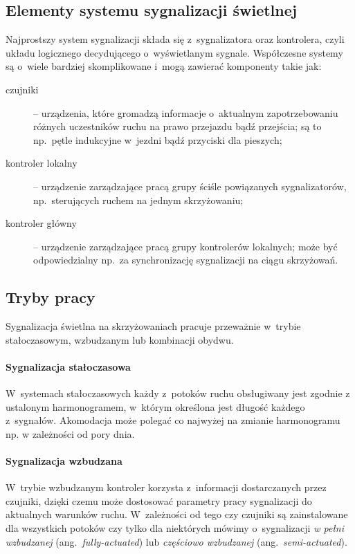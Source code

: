 \documentclass{pracamgr}
\newcommand{\ang}[1]{(ang.~\emph{#1})}
\theoremstyle{plain}
\begin{document}
\subsection{Elementy systemu sygnalizacji świetlnej}
\label{ss:elementy} Najprostszy system sygnalizacji składa się
z~sygnalizatora oraz kontrolera, czyli układu logicznego decydującego
o~wyświetlanym sygnale. Współczesne systemy są o~wiele bardziej
skomplikowane i~mogą zawierać komponenty takie jak:
\begin{description}
  \item[czujniki] -- urządzenia, które gromadzą informacje o~aktualnym
  zapotrzebowaniu różnych uczestników ruchu na prawo przejazdu bądź
  przejścia; są to np.~pętle indukcyjne w~jezdni bądź przyciski dla
  pieszych;
  \item[kontroler lokalny] -- urządzenie zarządzające pracą grupy
  ściśle powiązanych sygnalizatorów, np.~sterujących ruchem na jednym
  skrzyżowaniu;
  \item[kontroler główny] -- urządzenie zarządzające pracą grupy
  kontrolerów lokalnych; może być odpowiedzialny np.~za synchronizację
  sygnalizacji na ciągu skrzyżowań.
\end{description}

\subsection{Tryby pracy}
\label{ss:tryby} Sygnalizacja świetlna na skrzyżowaniach pracuje
przeważnie w~trybie stałoczasowym, wzbudzanym lub kombinacji obydwu.

\paragraph{Sygnalizacja stałoczasowa} W~systemach stałoczasowych każdy
z~potoków ruchu obsługiwany jest zgodnie z ustalonym harmonogramem,
w~którym określona jest długość każdego z~sygnałów. Akomodacja może
polegać co najwyżej na zmianie harmonogramu np. w zależności od pory dnia.

\paragraph{Sygnalizacja wzbudzana}
W~trybie wzbudzanym kontroler korzysta z~informacji dostarczanych
przez czujniki, dzięki czemu może dostosować parametry pracy
sygnalizacji do aktualnych warunków ruchu. W~zależności od tego czy
czujniki są zainstalowane dla wszystkich potoków czy tylko dla
niektórych mówimy o~sygnalizacji \emph{w pełni wzbudzanej}
\ang{fully-actuated} lub \emph{częściowo wzbudzanej}
\ang{semi-actuated}.
\end{document}
